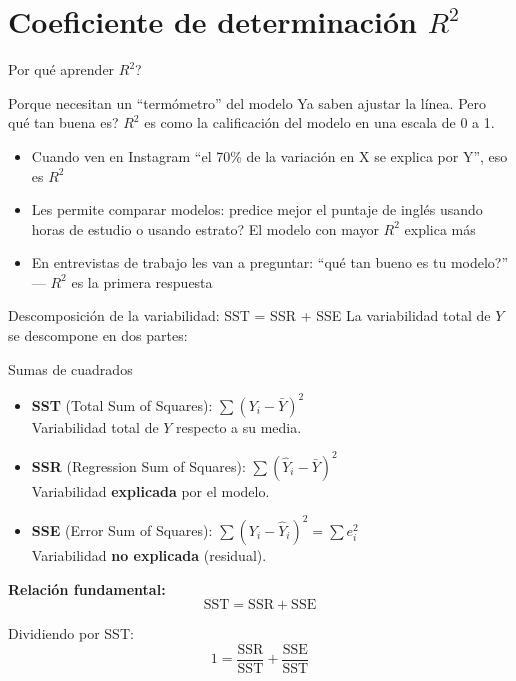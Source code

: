 \documentclass[aspectratio=169, 11pt]{beamer}
\begin{document}
\section{Coeficiente de determinación $R^2$}

\begin{frame}{\textquestiondown{}Por qu\'e aprender $R^2$?}
\begin{exampleblock}{Porque necesitan un ``term\'ometro'' del modelo}
\small
Ya saben ajustar la l\'inea. Pero \textquestiondown{}qu\'e tan buena es? $R^2$ es como la calificaci\'on del modelo en una escala de 0 a 1.
\begin{itemize}\setlength{\itemsep}{2pt}
  \item Cuando ven en Instagram ``el 70\% de la variaci\'on en X se explica por Y'', eso es $R^2$
  \item Les permite comparar modelos: \textquestiondown{}predice mejor el puntaje de ingl\'es usando horas de estudio o usando estrato? El modelo con mayor $R^2$ explica m\'as
  \item En entrevistas de trabajo les van a preguntar: ``\textquestiondown{}qu\'e tan bueno es tu modelo?'' --- $R^2$ es la primera respuesta
\end{itemize}
\end{exampleblock}
\end{frame}

\begin{frame}{Descomposición de la variabilidad: SST = SSR + SSE}
La variabilidad total de $Y$ se descompone en dos partes:

\begin{block}{Sumas de cuadrados}
\begin{itemize}
  \item \textbf{SST} (Total Sum of Squares): $\sum (Y_i - \bar{Y})^2$\\
    Variabilidad total de $Y$ respecto a su media.

  \item \textbf{SSR} (Regression Sum of Squares): $\sum (\hat{Y}_i - \bar{Y})^2$\\
    Variabilidad \textbf{explicada} por el modelo.

  \item \textbf{SSE} (Error Sum of Squares): $\sum (Y_i - \hat{Y}_i)^2 = \sum e_i^2$\\
    Variabilidad \textbf{no explicada} (residual).
\end{itemize}
\end{block}

\vspace{0.2cm}
\textbf{Relación fundamental:}
\[
\text{SST} = \text{SSR} + \text{SSE}
\]

Dividiendo por SST:
\[
1 = \frac{\text{SSR}}{\text{SST}} + \frac{\text{SSE}}{\text{SST}}
\]
\end{frame}
\end{document}
